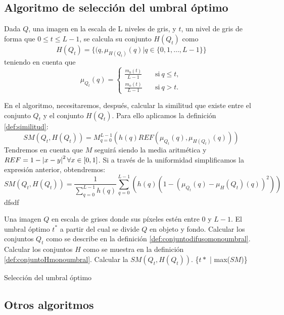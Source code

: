 \subsection{Algoritmo de selección del umbral óptimo}\label{sec:algoritmo3}

\begin{definition}\label{def:conjuntoHmonoumbral}
Dada $Q$, una imagen en la escala de L niveles de gris, y $t$, un nivel de gris de forma que $0\leq t\leq L-1$, se calcula su conjunto $H(Q_t)$ como
$$H(Q_t) = \{(q, \mu_{H(Q_t)}(q)|q\in \{0,1,\dots, L-1\}\}$$ 
teniendo en cuenta que
$$\mu_{Q_t}(q) = \left\{ \begin{aligned}
    \frac{m_b(t)}{L-1} & \quad\text{si}\ q\leq t,\\
    \frac{m_o(t)}{L-1} & \quad\text{si}\ q> t.
 \end{aligned}\right.$$
 \end{definition}

En el algoritmo, necesitaremos, después, calcular la similitud que existe entre el conjunto $Q_t$ y el conjunto $H(Q_t)$. Para ello aplicamos la definición \ref{def:similitud}:
$$SM(Q_t, H(Q_t)) = M^{L-1}_{q=0}(h(q)REF(\mu_{Q_t}(q), \mu_{H(Q_t)}(q)))$$
Tendremos en cuenta que $M$ seguirá siendo la media aritmética y $REF=1-\left\vert x-y\right\vert^2 \forall x\in[0,1]$. Si a través de la uniformidad simplificamos la expresión anterior, obtendremos:
$$SM(Q_t, H(Q_t)) = \frac{1}{\sum_{q=0}^{L-1}h(q)} \sum_{q=0}^{L-1}\left(h(q)(1-(\mu_{Q_t}(q)-\mu_H{(Q_t)}(q))^2)\right)$$
dfsdf

\begin{algorithm}[!ht]
\begin{algorithmic}[1]
\REQUIRE Una imagen $Q$ en escala de grises donde sus píxeles estén entre $0$ y $L-1$.
\ENSURE El umbral óptimo $t^*$ a partir del cual se divide $Q$ en objeto y fondo.
\STATE Calcular los conjuntos $Q_t$ como se describe en la definición \ref{def:conjuntodifusomonoumbral}.
\STATE Calcular los conjuntos $H$ como se muestra en la definición \ref{def:conjuntoHmonoumbral}.
\STATE Calcular la $SM(Q_t, H(Q_t))$.
\ENDFOR
\RETURN \{$t*$ | max($SM$)\}
\end{algorithmic}
\caption{Selección del umbral óptimo}\label{alg:algoritmo3}
\end{algorithm}



\subsection{Otros algoritmos}
